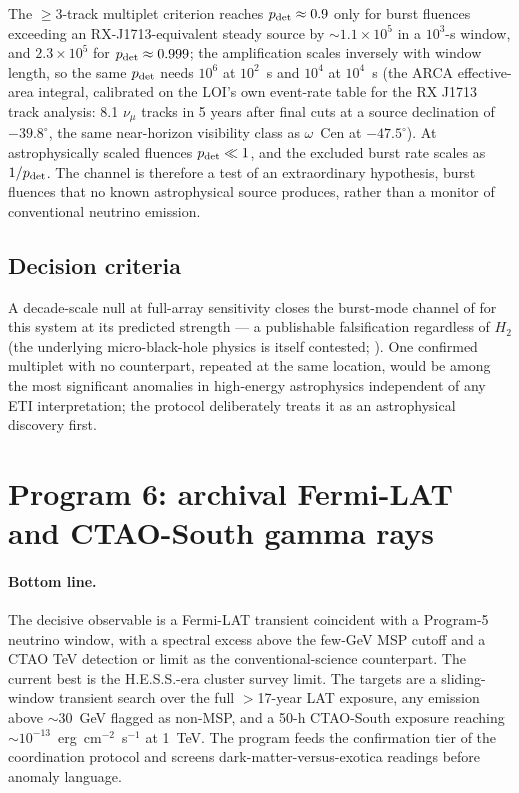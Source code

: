 \documentclass[11pt]{article}
\newcommand{\ocen}{\ensuremath{\omega}~Cen}
\begin{document}
The $\geq3$-track multiplet criterion reaches $p_{\rm det} \approx 0.9$ only for burst fluences exceeding an RX-J1713-equivalent steady source by $\sim1.1\times10^{5}$ in a $10^{3}$-s window, and $2.3\times10^{5}$ for $p_{\rm det} \approx 0.999$; the amplification scales inversely with window length, so the same $p_{\rm det}$ needs $10^{6}$ at $10^{2}$~s and $10^{4}$ at $10^{4}$~s (the ARCA effective-area integral, calibrated on the LOI's own event-rate table for the RX J1713 track analysis: 8.1 $\nu_\mu$ tracks in 5 years after final cuts at a source declination of $-39.8^{\circ}$, the same near-horizon visibility class as \ocen{} at $-47.5^{\circ}$). At astrophysically scaled fluences $p_{\rm det} \ll 1$, and the excluded burst rate scales as $1/p_{\rm det}$. The channel is therefore a test of an extraordinary hypothesis, burst fluences that no known astrophysical source produces, rather than a monitor of conventional neutrino emission.

\subsection{Decision criteria}

A decade-scale null at full-array sensitivity closes the burst-mode channel of \citet{Dvali2023} for this system at its predicted strength --- a publishable falsification regardless of $H_2$ (the underlying micro-black-hole physics is itself contested; \citealt{AlvarezDominguez2024,Loeb2024Comment}). One confirmed multiplet with no counterpart, repeated at the same location, would be among the most significant anomalies in high-energy astrophysics independent of any ETI interpretation; the protocol deliberately treats it as an astrophysical discovery first.

\section{Program 6: archival Fermi-LAT and CTAO-South gamma rays}
\label{sec:gamma}

\paragraph{Bottom line.} The decisive observable is a Fermi-LAT transient coincident with a Program-5 neutrino window, with a spectral excess above the few-GeV MSP cutoff and a CTAO TeV detection or limit as the conventional-science counterpart. The current best is the H.E.S.S.-era cluster survey limit. The targets are a sliding-window transient search over the full $>$17-year LAT exposure, any emission above $\sim$30~GeV flagged as non-MSP, and a 50-h CTAO-South exposure reaching $\sim10^{-13}$~erg~cm$^{-2}$~s$^{-1}$ at 1~TeV. The program feeds the confirmation tier of the coordination protocol and screens dark-matter-versus-exotica readings before anomaly language.
\end{document}
